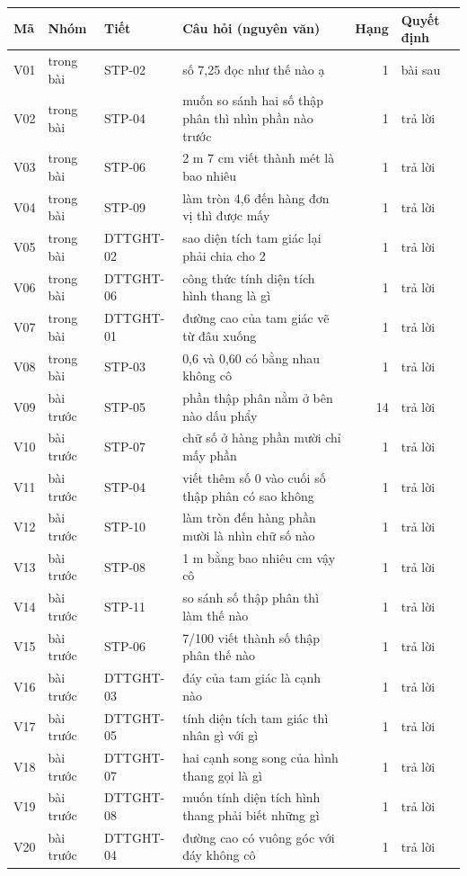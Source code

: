 {\scriptsize
\begin{tabular}{@{}lllp{7.4cm}rl@{}}
\toprule
Mã & Nhóm & Tiết & Câu hỏi (nguyên văn) & Hạng & Quyết định \\
\midrule
V01 & trong bài & STP-02 & số 7,25 đọc như thế nào ạ & 1 & bài sau \\
V02 & trong bài & STP-04 & muốn so sánh hai số thập phân thì nhìn phần nào trước & 1 & trả lời \\
V03 & trong bài & STP-06 & 2 m 7 cm viết thành mét là bao nhiêu & 1 & trả lời \\
V04 & trong bài & STP-09 & làm tròn 4,6 đến hàng đơn vị thì được mấy & 1 & trả lời \\
V05 & trong bài & DTTGHT-02 & sao diện tích tam giác lại phải chia cho 2 & 1 & trả lời \\
V06 & trong bài & DTTGHT-06 & công thức tính diện tích hình thang là gì & 1 & trả lời \\
V07 & trong bài & DTTGHT-01 & đường cao của tam giác vẽ từ đâu xuống & 1 & trả lời \\
V08 & trong bài & STP-03 & 0,6 và 0,60 có bằng nhau không cô & 1 & trả lời \\
V09 & bài trước & STP-05 & phần thập phân nằm ở bên nào dấu phẩy & 14 & trả lời \\
V10 & bài trước & STP-07 & chữ số ở hàng phần mười chỉ mấy phần & 1 & trả lời \\
V11 & bài trước & STP-04 & viết thêm số 0 vào cuối số thập phân có sao không & 1 & trả lời \\
V12 & bài trước & STP-10 & làm tròn đến hàng phần mười là nhìn chữ số nào & 1 & trả lời \\
V13 & bài trước & STP-08 & 1 m bằng bao nhiêu cm vậy cô & 1 & trả lời \\
V14 & bài trước & STP-11 & so sánh số thập phân thì làm thế nào & 1 & trả lời \\
V15 & bài trước & STP-06 & 7/100 viết thành số thập phân thế nào & 1 & trả lời \\
V16 & bài trước & DTTGHT-03 & đáy của tam giác là cạnh nào & 1 & trả lời \\
V17 & bài trước & DTTGHT-05 & tính diện tích tam giác thì nhân gì với gì & 1 & trả lời \\
V18 & bài trước & DTTGHT-07 & hai cạnh song song của hình thang gọi là gì & 1 & trả lời \\
V19 & bài trước & DTTGHT-08 & muốn tính diện tích hình thang phải biết những gì & 1 & trả lời \\
V20 & bài trước & DTTGHT-04 & đường cao có vuông góc với đáy không cô & 1 & trả lời \\

\end{tabular}}
